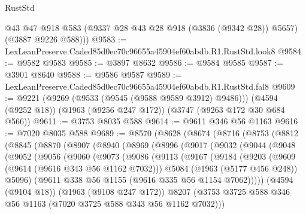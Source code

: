 \begin{lexlean}{RustStd}
\begin{coremodule}
        @43
        @47
        @918
        @583
        (@9337 @28 @43 @28 @918 (@3836 (@9342 @28)) @5657)
        (@3887 @9226 @588)))
@9583 := LexLeanPreserve.Caded85d0ec70c96655a45904ef60abdb.R1.RustStd.look8
@9584 := @9582 @9583
@9585 := @3897 @8632
@9586 := @9584 @9585
@9587 := @3901 @8640
@9588 := @9586 @9587
@9589 := LexLeanPreserve.Caded85d0ec70c96655a45904ef60abdb.R1.RustStd.fal8
@9609 := @9221
    (@9269 (@9533 (@9545 (@9588 @9589 @3912) @9486)))
    (@4594 (@9252 @18))
    (@1963 (@9256 @247 @172))
    (@3747 (@9263 @172 @30 @684 @566))
@9611 := @3753 @8035 @588
@9614 := @9611 @346 @56 @1163
@9616 := @7020 @8035 @588
@9689 := @8570
    (@8628
      (@8674
        (@8716
          (@8753
            (@8812
              (@8845
                (@8870
                  (@8907
                    (@8940
                      (@8969
                        (@8996
                          (@9017
                            (@9032
                              (@9044
                                (@9048
                                  (@9052
                                    (@9056
                                      (@9060
                                        (@9073
                                          (@9086
                                            (@9113
                                              (@9167
                                                (@9184
                                                  (@9203
                                                    (@9609 (@9614 (@9616 @343 @56 @1162 @7032)))
                                                    @5084
                                                    (@1963 (@5177 @456 @248))
                                                    @5096)
                                                  (@9611
                                                    @338
                                                    @56
                                                    @1155
                                                    (@9616 @335 @56 @1154 @7062)))))
                                            (@4594 (@9104 @18))
                                            (@1963 (@9108 @247 @172))
                                            @8207
                                            (@3753
                                              @3725
                                              @588
                                              @346
                                              @56
                                              @1163
                                              (@7020 @3725 @588 @343 @56 @1162 @7032)))

\end{coremodule}
\end{lexlean}
